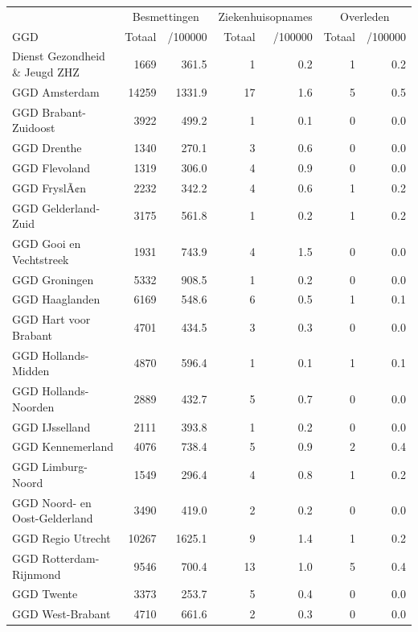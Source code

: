 \documentclass[
  english,
  man,floatsintext]{apa6}
\begin{document}
\begin{table}
\centering\begingroup\fontsize{10}{12}\selectfont

\begin{threeparttable}
\begin{tabular}{lrrrrrr}
\toprule
\multicolumn{1}{c}{ } & \multicolumn{2}{c}{Besmettingen} & \multicolumn{2}{c}{Ziekenhuisopnames} & \multicolumn{2}{c}{Overleden} \\
\cmidrule(l{3pt}r{3pt}){2-3} \cmidrule(l{3pt}r{3pt}){4-5} \cmidrule(l{3pt}r{3pt}){6-7}
GGD & Totaal & /100000 & Totaal & /100000 & Totaal & /100000\\
\midrule
Dienst Gezondheid \& Jeugd ZHZ & 1669 & 361.5 & 1 & 0.2 & 1 & 0.2\\
GGD Amsterdam & 14259 & 1331.9 & 17 & 1.6 & 5 & 0.5\\
GGD Brabant-Zuidoost & 3922 & 499.2 & 1 & 0.1 & 0 & 0.0\\
GGD Drenthe & 1340 & 270.1 & 3 & 0.6 & 0 & 0.0\\
GGD Flevoland & 1319 & 306.0 & 4 & 0.9 & 0 & 0.0\\
GGD FryslÃ¢n & 2232 & 342.2 & 4 & 0.6 & 1 & 0.2\\
GGD Gelderland-Zuid & 3175 & 561.8 & 1 & 0.2 & 1 & 0.2\\
GGD Gooi en Vechtstreek & 1931 & 743.9 & 4 & 1.5 & 0 & 0.0\\
GGD Groningen & 5332 & 908.5 & 1 & 0.2 & 0 & 0.0\\
GGD Haaglanden & 6169 & 548.6 & 6 & 0.5 & 1 & 0.1\\
GGD Hart voor Brabant & 4701 & 434.5 & 3 & 0.3 & 0 & 0.0\\
GGD Hollands-Midden & 4870 & 596.4 & 1 & 0.1 & 1 & 0.1\\
GGD Hollands-Noorden & 2889 & 432.7 & 5 & 0.7 & 0 & 0.0\\
GGD IJsselland & 2111 & 393.8 & 1 & 0.2 & 0 & 0.0\\
GGD Kennemerland & 4076 & 738.4 & 5 & 0.9 & 2 & 0.4\\
GGD Limburg-Noord & 1549 & 296.4 & 4 & 0.8 & 1 & 0.2\\
GGD Noord- en Oost-Gelderland & 3490 & 419.0 & 2 & 0.2 & 0 & 0.0\\
GGD Regio Utrecht & 10267 & 1625.1 & 9 & 1.4 & 1 & 0.2\\
GGD Rotterdam-Rijnmond & 9546 & 700.4 & 13 & 1.0 & 5 & 0.4\\
GGD Twente & 3373 & 253.7 & 5 & 0.4 & 0 & 0.0\\
GGD West-Brabant & 4710 & 661.6 & 2 & 0.3 & 0 & 0.0\\

\end{tabular}
\end{threeparttable}
\end{table}
\end{document}
